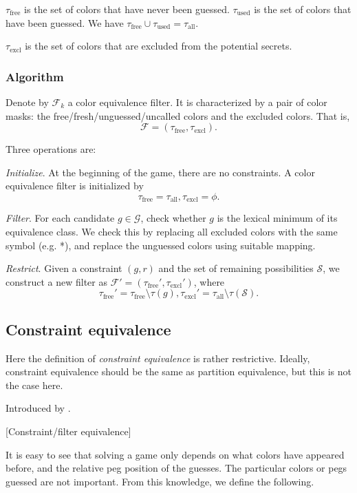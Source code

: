 $\tau_{\text{free}}$ is the set of colors that have never been guessed. $\tau_{\text{used}}$ is the set of colors that have been guessed. We have $\tau_{\text{free}} \cup \tau_{\text{used}} = \tau_\text{all}$.

$\tau_{\text{excl}}$ is the set of colors that are excluded from the potential secrets.


\subsubsection{Algorithm}

\newcommand{\cmall}{\tau_\text{all}}
\newcommand{\cmfree}{\tau_\text{free}}
\newcommand{\cmexcl}{\tau_\text{excl}}

Denote by $\mathcal{F}_k$ a color equivalence filter. It is characterized by a pair of color masks: the free/fresh/unguessed/uncalled colors and the excluded colors. That is,
\[
\mathcal{F} = (\tau_\text{free}, \tau_\text{excl}) .
\]

Three operations are:

\emph{Initialize}. At the beginning of the game, there are no constraints. A color equivalence filter is initialized by
\[
\cmfree = \cmall, \cmexcl = \phi .
\]

\emph{Filter}. For each candidate $g \in \mathcal{G}$, check whether $g$ is the lexical minimum of its equivalence class. We check this by replacing all excluded colors with the same symbol (e.g. *), and replace the unguessed colors using suitable mapping.

\emph{Restrict}. Given a constraint $(g,r)$ and the set of remaining possibilities $\mathcal{S}$, we construct a new filter as $\mathcal{F}' = (\cmfree', \cmexcl')$, where
\[
\cmfree' = \cmfree \setminus \tau(g), \cmexcl' = \cmall \setminus \tau(\mathcal{S})  .
\]



\subsection{Constraint equivalence}

Here the definition of \emph{constraint equivalence} is rather restrictive. Ideally, constraint equivalence should be the same as partition equivalence, but this is not the case here.

Introduced by \cite{neuwirth81,koyama93}. 

[Constraint/filter equivalence]

It is easy to see that solving a game only depends on what colors have appeared before, and the relative peg position of the guesses. The particular colors or pegs guessed are not important. From this knowledge, we define the following.

